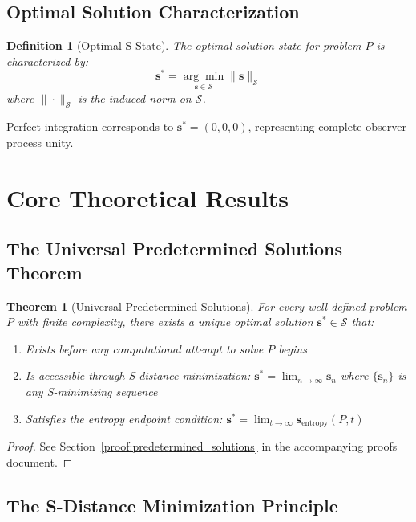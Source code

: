 \documentclass[12pt,a4paper]{article}
\newtheorem{theorem}{Theorem}
\newtheorem{definition}{Definition}
\begin{document}
\subsection{Optimal Solution Characterization}

\begin{definition}[Optimal S-State]
The optimal solution state for problem $P$ is characterized by:
\begin{equation}
\mathbf{s}^* = \underset{\mathbf{s} \in \mathcal{S}}{\arg\min} \|\mathbf{s}\|_{\mathcal{S}}
\end{equation}
where $\|\cdot\|_{\mathcal{S}}$ is the induced norm on $\mathcal{S}$.
\end{definition}

Perfect integration corresponds to $\mathbf{s}^* = (0, 0, 0)$, representing complete observer-process unity.

\section{Core Theoretical Results}

\subsection{The Universal Predetermined Solutions Theorem}

\begin{theorem}[Universal Predetermined Solutions]
\label{thm:predetermined_solutions}
For every well-defined problem $P$ with finite complexity, there exists a unique optimal solution $\mathbf{s}^* \in \mathcal{S}$ that:
\begin{enumerate}
\item Exists before any computational attempt to solve $P$ begins
\item Is accessible through S-distance minimization: $\mathbf{s}^* = \lim_{n \to \infty} \mathbf{s}_n$ where $\{\mathbf{s}_n\}$ is any S-minimizing sequence
\item Satisfies the entropy endpoint condition: $\mathbf{s}^* = \lim_{t \to \infty} \mathbf{s}_{\text{entropy}}(P, t)$
\end{enumerate}
\end{theorem}

\begin{proof}
See Section~\ref{proof:predetermined_solutions} in the accompanying proofs document.
\end{proof}

\subsection{The S-Distance Minimization Principle}
\end{document}
